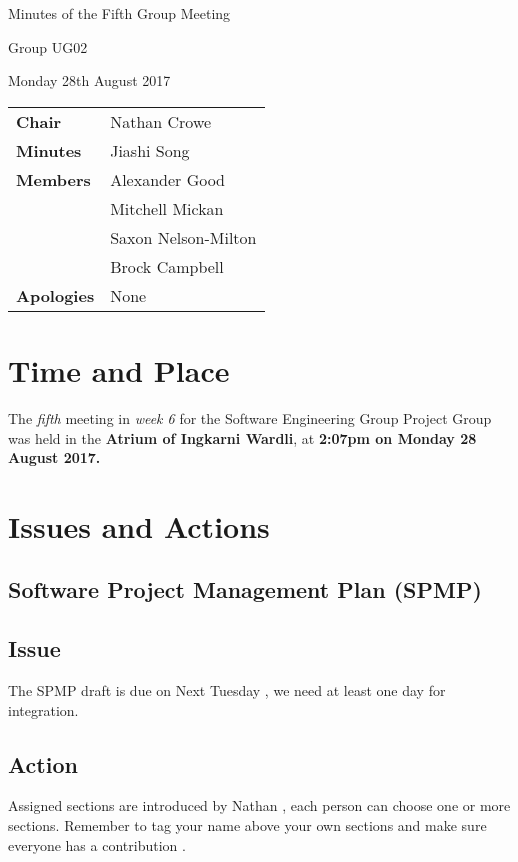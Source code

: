 \documentclass{article}
\begin{document}
\begin{center}    
{\huge Minutes of the Fifth Group Meeting \par}
\vspace{0.5cm}
{\large Group UG02 \par}
\vspace{0.5cm}
{\large Monday 28th August 2017 \par}
\vspace{0.5cm}
\end{center}

\begin{flushleft}
\begin{tabular}{ll}
{\bfseries Chair} &  Nathan Crowe \\
{\bfseries Minutes} & Jiashi Song \\
{\bfseries Members}
 & Alexander Good \\
 & Mitchell Mickan \\
 & Saxon Nelson-Milton \\
 & Brock Campbell \\
{\bfseries Apologies} & None\\
\end{tabular}
\end{flushleft}

\section{Time and Place}
The {\itshape fifth} meeting in {\itshape week 6} for the Software Engineering Group Project Group was held in the {\bfseries Atrium of Ingkarni Wardli}, at {\bfseries 2:07pm on Monday 28 August 2017.} 

\section{Issues and Actions}
  \subsection{Software Project Management Plan (SPMP)}
  \subsection*{Issue}
  The SPMP draft is due on Next Tuesday , we need at least one day for integration.
  \subsection*{Action}
  Assigned sections are introduced by Nathan , each person can choose one or more sections. Remember to tag your name above your own sections and make sure everyone has a contribution .
  
\end{document}
